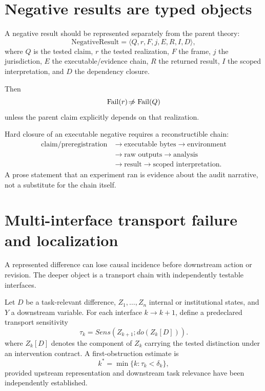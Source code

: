 \section{Negative results are typed objects}

A negative result should be represented separately from the parent theory:
\begin{equation}
\mathrm{NegativeResult}=\langle Q,r,F,j,E,R,I,D\rangle,
\end{equation}
where $Q$ is the tested claim, $r$ the tested realization, $F$ the frame, $j$ the jurisdiction, $E$ the executable/evidence chain, $R$ the returned result, $I$ the scoped interpretation, and $D$ the dependency closure.

Then
\begin{equation}
\mathrm{Fail}(r)\mathrel{\not\!\Rightarrow}\mathrm{Fail}(Q)
\end{equation}
unless the parent claim explicitly depends on that realization.

Hard closure of an executable negative requires a reconstructible chain:
\begin{align}
\text{claim/preregistration}
&\rightarrow\text{executable bytes}\rightarrow\text{environment}\nonumber\\
&\rightarrow\text{raw outputs}\rightarrow\text{analysis}\nonumber\\
&\rightarrow\text{result}\rightarrow\text{scoped interpretation}.
\end{align}
A prose statement that an experiment ran is evidence about the audit narrative, not a substitute for the chain itself.

\section{Multi-interface transport failure and localization}
\label{sec:deep-torsion}

A represented difference can lose causal incidence before downstream action or revision. The deeper object is a transport chain with independently testable interfaces.

Let $D$ be a task-relevant difference, $Z_1,\ldots,Z_n$ internal or institutional states, and $Y$ a downstream variable. For each interface $k\rightarrow k+1$, define a predeclared transport sensitivity
\begin{equation}
\tau_k = Sens(Z_{k+1};do(Z_k[D])).
\label{eq:deep-tau}
\end{equation}
where $Z_k[D]$ denotes the component of $Z_k$ carrying the tested distinction under an intervention contract. A first-obstruction estimate is
\begin{equation}
k^*=\min\{k:\tau_k<\delta_k\},
\label{eq:deep-first-obstruction}
\end{equation}
provided upstream representation and downstream task relevance have been independently established.

